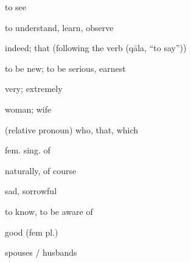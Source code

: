 \documentclass[avery5371,grid,frame]{flashcards}
\begin{document}
\begin{flashcard}{\LARGE to see}
\LARGE {}
\end{flashcard}
\begin{flashcard}{\LARGE to understand, learn, observe}
\LARGE {}
\end{flashcard}
\begin{flashcard}{\LARGE indeed; that (following the verb  (qāla, “to say”))}
\LARGE {}
\end{flashcard}
\begin{flashcard}{\LARGE to be new; to be serious, earnest}
\LARGE {}
\end{flashcard}
\begin{flashcard}{\LARGE very; extremely}
\LARGE {}
\end{flashcard}
\begin{flashcard}{\LARGE woman; wife}
\LARGE {}
\end{flashcard}
\begin{flashcard}{\LARGE (relative pronoun) who, that, which}
\LARGE {}
\end{flashcard}
\begin{flashcard}{\LARGE fem. sing. of }
\LARGE {}
\end{flashcard}
\begin{flashcard}{\LARGE naturally, of course}
\LARGE {}
\end{flashcard}
\begin{flashcard}{\LARGE sad, sorrowful}
\LARGE {}
\end{flashcard}
\begin{flashcard}{\LARGE to know, to be aware of}
\LARGE {}
\end{flashcard}
\begin{flashcard}{\LARGE good (fem pl.)}
\LARGE {}
\end{flashcard}
\begin{flashcard}{\LARGE spouses / husbands}
\LARGE {}
\end{flashcard}
\end{document}
